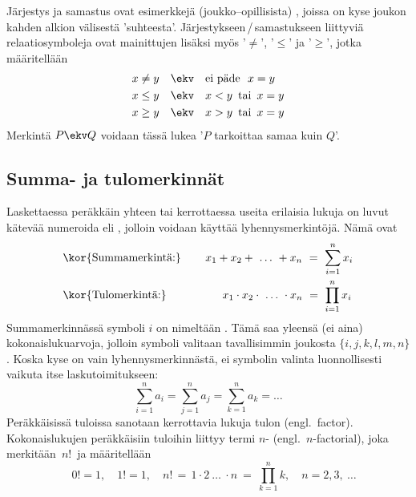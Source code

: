 Järjestys ja samastus ovat esimerkkejä (joukko--opillisista) , joissa on kyse joukon
kahden alkion välisestä 'suhteesta'. Järjestykseen\,/\,samastukseen liittyviä relaatiosymboleja ovat 
mainittujen lisäksi myös '$\neq$', '$\le$' ja '$\ge$', jotka määritellään
\begin{align*}
x \neq y \quad &\ekv \quad \text{ei päde}\ \ x=y \\
x \le y  \quad &\ekv \quad x < y\,\ \text{tai}\,\ x = y \\
x \ge y  \quad &\ekv \quad x > y\,\ \text{tai}\,\ x = y
\end{align*}
Merkintä $P \ekv Q$ voidaan tässä lukea '$P$ tarkoittaa samaa kuin $Q$'.

\subsection*{Summa- ja tulomerkinnät}

Laskettaessa peräkkäin yhteen tai kerrottaessa useita erilaisia lukuja on luvut kätevää 
numeroida eli , jolloin voidaan käyttää lyhennysmerkintöjä. Nämä ovat 
\begin{align*}
&\text{\kor{Summamerkintä:}} \qquad\, x_1 + x_2 + \ \ldots\  + x_n\ =\ \sum_{i=1}^n x_i \\
&\text{\kor{Tulomerkintä:}} \qquad\qquad\quad x_1 \cdot x_2 \cdot\ \ldots\ \cdot x_n\ 
                                                                    =\ \prod_{i=1}^n x_i
\end{align*}
Summamerkinnässä symboli $i$ on nimeltään . Tämä saa yleensä (ei aina)
kokonaislukuarvoja, jolloin symboli valitaan tavallisimmin joukosta $\{i,j,k,l,m,n\}$.
Koska kyse on vain lyhennysmerkinnästä, ei symbolin valinta luonnollisesti vaikuta itse 
laskutoimitukseen:
\[
\sum_{i=1}^n a_i = \sum_{j=1}^n a_j = \sum_{k=1}^n a_k = \ldots
\]
Peräkkäisissä tuloissa sanotaan kerrottavia lukuja tulon  (engl.\ factor).
Kokonaislukujen peräkkäisiin tuloihin liittyy termi $n$-\kor{kertoma} (engl.\ $n$-factorial),
joka merkitään $\,n!\,$ ja määritellään
\[
\quad 0! = 1, \quad 1! = 1, \quad n!\,=\,1 \cdot 2 \ \ldots\ \cdot n\ 
                                      =\ \prod_{k=1}^n k, \quad n = 2,3,\ \ldots
\]



